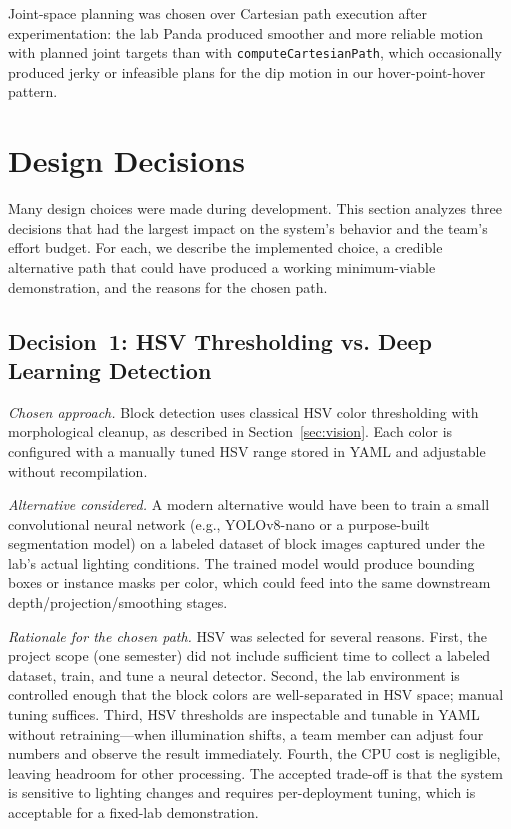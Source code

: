 \documentclass[conference]{IEEEtran}
\begin{document}
Joint-space planning was chosen over Cartesian path execution after
experimentation: the lab Panda produced smoother and more reliable
motion with planned joint targets than with
\texttt{computeCartesianPath}, which occasionally produced jerky or
infeasible plans for the dip motion in our hover-point-hover pattern.

\section{Design Decisions}
\label{sec:decisions}

Many design choices were made during development. This section
analyzes three decisions that had the largest impact on the system's
behavior and the team's effort budget. For each, we describe the
implemented choice, a credible alternative path that could have
produced a working minimum-viable demonstration, and the reasons for
the chosen path.

\subsection{Decision~1: HSV Thresholding vs. Deep Learning Detection}

\textit{Chosen approach.} Block detection uses classical HSV color
thresholding with morphological cleanup, as described in
Section~\ref{sec:vision}. Each color is configured with a manually
tuned HSV range stored in YAML and adjustable without recompilation.

\textit{Alternative considered.} A modern alternative would have been
to train a small convolutional neural network (e.g., YOLOv8-nano or a
purpose-built segmentation model) on a labeled dataset of block images
captured under the lab's actual lighting conditions. The trained
model would produce bounding boxes or instance masks per color, which
could feed into the same downstream depth/projection/smoothing stages.

\textit{Rationale for the chosen path.} HSV was selected for several
reasons. First, the project scope (one semester) did not include
sufficient time to collect a labeled dataset, train, and tune a neural
detector. Second, the lab environment is controlled enough that the
block colors are well-separated in HSV space; manual tuning suffices.
Third, HSV thresholds are inspectable and tunable in YAML without
retraining---when illumination shifts, a team member can adjust four
numbers and observe the result immediately. Fourth, the CPU cost is
negligible, leaving headroom for other processing. The accepted
trade-off is that the system is sensitive to lighting changes and
requires per-deployment tuning, which is acceptable for a fixed-lab
demonstration.
\end{document}
